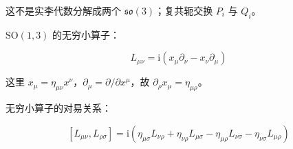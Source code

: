 这不是实李代数分解成两个 $\mathfrak{so}\left(3\right)$；复共轭交换 $P_i$ 与 $Q_i$。

$\mathrm{SO}\left(1,3\right)$ 的无穷小算子：

\begin{equation}
L_{\mu\nu}
=\mathrm{i}\left(x_\mu\partial_\nu-x_\nu\partial_\mu \right)
\end{equation}

这里 $x_\mu=\eta_{\mu\nu}x^\nu$，$\partial_\mu=\partial/\partial x^\mu$，故 $\partial_\rho x_\mu=\eta_{\mu\rho}$。

无穷小算子的对易关系：

\begin{equation}
\left[L_{\mu\nu} , L_{\rho\sigma} \right]
=\mathrm{i}\left(\eta_{\mu\sigma} L_{\nu\rho} + \eta_{\nu\rho} L_{\mu\sigma} - \eta_{\mu\rho} L_{\nu\sigma} - \eta_{\nu\sigma} L_{\mu\rho} \right)
\end{equation}

